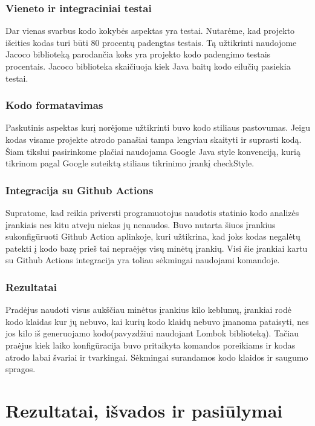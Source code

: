 \documentclass{VUMIFPSkursinis}
\begin{document}
		\subsubsection{Vieneto ir integraciniai testai}
			Dar vienas svarbus kodo kokybės aspektas yra testai.
			Nutarėme, kad projekto išeities kodas turi būti 80 procentų padengtas testais.
			Tą užtikrinti naudojome Jacoco biblioteką parodančia koks yra projekto kodo padengimo testais procentais.
			Jacoco biblioteka skaičiuoja kiek Java baitų kodo eilučių pasiekia testai.
		\subsubsection{Kodo formatavimas}
			Paskutinis aspektas kurį norėjome užtikrinti buvo kodo stiliaus pastovumas.
			Jeigu kodas visame projekte atrodo panašiai tampa lengviau skaityti ir suprasti kodą.
			Šiam tikslui pasirinkome plačiai naudojama Google Java style konvenciją, kurią tikrinom pagal Google suteiktą stiliaus tikrinimo įrankį checkStyle. 
		\subsubsection{Integracija su Github Actions}
			Supratome, kad reikia priversti programuotojus naudotis statinio kodo analizės įrankiais nes kitu atveju niekas jų nenaudos.
			Buvo nutarta šiuos įrankius sukonfigūruoti Github Action aplinkoje, kuri užtikrina, kad joks kodas negalėtų patekti į kodo bazę prieš tai nepraėjęs visų minėtų įrankių.
			Visi šie įrankiai kartu su Github Actions integracija yra toliau sėkmingai naudojami komandoje.
		\subsubsection{Rezultatai}
			Pradėjus naudoti visus aukščiau minėtus įrankius kilo keblumų, įrankiai rodė kodo klaidas kur jų nebuvo, kai kurių kodo klaidų
			nebuvo įmanoma pataisyti, nes jos kilo iš generuojamo kodo(pavyzdžiui  naudojant Lombok biblioteką).
			Tačiau praėjus kiek laiko konfigūracija buvo pritaikyta komandos poreikiams ir kodas atrodo labai švariai ir tvarkingai.
			Sėkmingai surandamos kodo klaidos ir saugumo spragos.

		
\section{Rezultatai, išvados ir pasiūlymai}
\end{document}
